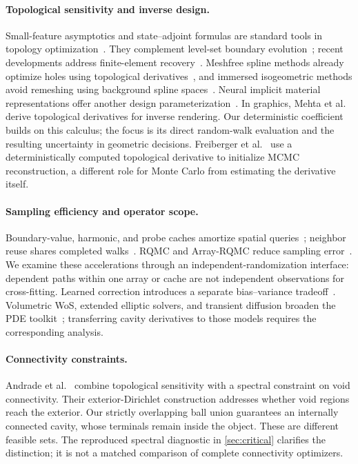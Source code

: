 \paragraph{Topological sensitivity and inverse design.}
Small-feature asymptotics and state--adjoint formulas are standard tools in topology optimization~\cite{cea2000topological,novotny2012topological,baumann2022complete,gangl2022automated}. They complement level-set boundary evolution~\cite{allaire2004structural,burger2004incorporating}; recent developments address finite-element recovery~\cite{li2026superconvergence}. Meshfree spline methods already optimize holes using topological derivatives~\cite{hur2017topology}, and immersed isogeometric methods avoid remeshing using background spline spaces~\cite{teixeira2026isogeometric}. Neural implicit material representations offer another design parameterization~\cite{zehnder2021ntopo}. In graphics, Mehta et al.~\cite{mehta2023theory} derive topological derivatives for inverse rendering. Our deterministic coefficient builds on this calculus; the focus is its direct random-walk evaluation and the resulting uncertainty in geometric decisions. Freiberger et al.~\cite{freiberger2011using} use a deterministically computed topological derivative to initialize MCMC reconstruction, a different role for Monte Carlo from estimating the derivative itself.

\paragraph{Sampling efficiency and operator scope.}
Boundary-value, harmonic, and probe caches amortize spatial queries~\cite{miller2023boundary,zhou2025harmonic,huang2026probe}; neighbor reuse shares completed walks~\cite{czekanski2026neighbors}. RQMC and Array-RQMC reduce sampling error~\cite{ho2026randomized,ho2026array}. We examine these accelerations through an independent-randomization interface: dependent paths within one array or cache are not independent observations for cross-fitting. Learned correction introduces a separate bias--variance tradeoff~\cite{hsu2026mc2}. Volumetric WoS, extended elliptic solvers, and transient diffusion broaden the PDE toolkit~\cite{miller2025volumetric,cimpean2026extended,zhou2026transient}; transferring cavity derivatives to those models requires the corresponding analysis.

\paragraph{Connectivity constraints.}
Andrade et al.~\cite{andrade2026connectivity} combine topological sensitivity with a spectral constraint on void connectivity. Their exterior-Dirichlet construction addresses whether void regions reach the exterior. Our strictly overlapping ball union guarantees an internally connected cavity, whose terminals remain inside the object. These are different feasible sets. The reproduced spectral diagnostic in \cref{sec:critical} clarifies the distinction; it is not a matched comparison of complete connectivity optimizers.

